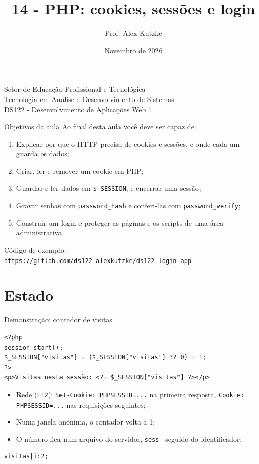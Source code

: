 \documentclass{beamer}
\title{14 - PHP: cookies, sessões e login}
\author{Prof. Alex Kutzke}
\date{Novembro de 2026}
\begin{document}
\begin{frame}
	\begin{center}
		\large{Setor de Educação Profissional e Tecnológica}\\
		Tecnologia em Análise e Desenvolvimento de Sistemas\\
		\vspace{1cm}
		\small{DS122 - Desenvolvimento de Aplicações Web 1}
	\end{center}
	\titlepage
\end{frame}

\begin{frame}{Objetivos da aula}
	Ao final desta aula você deve ser capaz de:
	\begin{enumerate}
		\item Explicar por que o HTTP precisa de cookies e sessões, e onde cada um
		      guarda os dados;
		\item Criar, ler e remover um cookie em PHP;
		\item Guardar e ler dados em \texttt{\$\_SESSION}, e encerrar uma sessão;
		\item Gravar senhas com \texttt{password\_hash} e conferi-las com
		      \texttt{password\_verify};
		\item Construir um login e proteger as páginas e os scripts de uma área
		      administrativa.
	\end{enumerate}

	\vspace{0.2cm}
	Código de exemplo:\\
	{\small\mbox{\texttt{https://gitlab.com/ds122-alexkutzke/ds122-login-app}}}
\end{frame}

\section{Estado}

\begin{frame}[fragile]{Demonstração: contador de visitas}
	\begin{verbatim}
<?php
session_start();
$_SESSION["visitas"] = ($_SESSION["visitas"] ?? 0) + 1;
?>
<p>Visitas nesta sessão: <?= $_SESSION["visitas"] ?></p>
	\end{verbatim}

	\begin{itemize}
		\item Rede (\texttt{F12}): \texttt{Set-Cookie: PHPSESSID=...} na primeira
		      resposta, \texttt{Cookie: PHPSESSID=...} nas requisições seguintes;
		\item Numa janela anônima, o contador volta a 1;
		\item O número fica num arquivo do servidor, \texttt{sess\_} seguido do
		      identificador:
	\end{itemize}

	\begin{verbatim}
visitas|i:2;
	\end{verbatim}
\end{frame}
\end{document}

